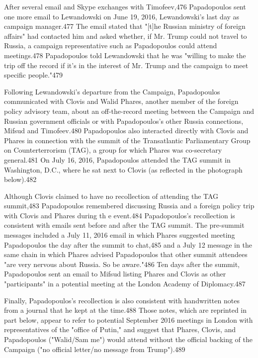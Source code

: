 After several email and Skype exchanges with Timofeev,476 Papadopoulos sent one more email to Lewandowski on June 19,  2016, Lewandowski's last day as campaign manager.477 The email stated that "[t]he Russian ministry of foreign affairs" had contacted him and asked whether, if  Mr. Trump could not travel to Russia,  a  campaign representative such as Papadopoulos could attend meetings.478 Papadopoulos told Lewandowski that he was "willing to make the trip off the record if  it's in the interest of Mr. Trump and the campaign to meet specific people."479

Following Lewandowski's departure from the Campaign, Papadopoulos communicated with Clovis and Walid Phares,  another member of the foreign policy advisory team, about an off-the-record meeting between the Campaign and Russian government officials or with Papadopoulos's other Russia connections, Mifsud and Timofeev.480 Papadopoulos also interacted directly with Clovis and Phares in connection with the summit of the Transatlantic Parliamentary Group on Counterterrorism (TAG), a group for which Phares was co-secretary general.481 On July 16, 2016, Papadopoulos attended the TAG summit in Washington, D.C., where he sat next to Clovis (as reflected in the photograph below).482


Although Clovis claimed to have no recollection of attending the TAG summit,483 Papadopoulos remembered discussing Russia and a  foreign policy trip with Clovis and Phares during th e  event.484 Papadopoulos's recollection is consistent with  emails sent before and after the TAG summit. The pre-summit messages included a  July 11,  2016 email in which Phares suggested meeting Papadopoulos the day after the summit to chat,485 and a July 12 message in the same chain in which Phares advised Papadopoulos that other summit attendees "are very nervous about Russia.  So be aware."486 Ten days after the summit, Papadopoulos sent an email to Mifsud listing Phares and Clovis as other "participants" in a potential meeting at the London Academy of Diplomacy.487

Finally, Papadopoulos's recollection is also consistent with handwritten notes from a journal that he kept at the time.488 Those notes, which are reprinted in part below, appear to refer to potential September 2016 meetings in London with representatives of the "office of Putin," and suggest that Phares, Clovis, and Papadopoulos ("Walid/Sam me") would attend without the official backing of the Campaign ("no official letter/no message from Trump").489


